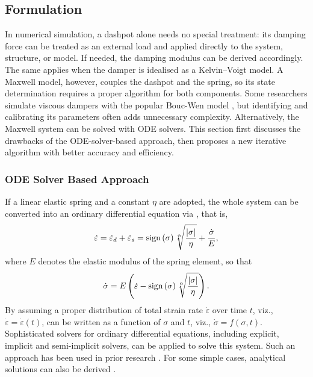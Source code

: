 \subsection{Formulation}
In numerical simulation, a dashpot alone needs no special treatment: its damping force can be treated as an external load and applied directly to the system, structure, or model.
If needed, the damping modulus can be derived accordingly.
The same applies when the damper is idealised as a Kelvin--Voigt model.
A Maxwell model, however, couples the dashpot and the spring, so its state determination requires a proper algorithm for both components.
Some researchers simulate viscous dampers with the popular Bouc-Wen \cite{Wen1976} model \cite{Gong2016,Chang2016}, but identifying and calibrating its parameters often adds unnecessary complexity.
Alternatively, the Maxwell system can be solved with ODE solvers.
This section first discusses the drawbacks of the ODE-solver-based approach, then proposes a new iterative algorithm with better accuracy and efficiency.
\subsubsection{ODE Solver Based Approach}\label{sec:ode_issue}
If a linear elastic spring and a constant $\eta$ are adopted, the whole system can be converted into an ordinary differential equation via , that is,
\begin{gather}
\dot\varepsilon=\dot\varepsilon_d+\dot\varepsilon_s=\text{sign}\left(\sigma\right)\sqrt[\alpha]{\dfrac{\left\vert\sigma\right\vert}{\eta}}+\dfrac{\dot\sigma}{E},
\end{gather}
where $E$ denotes the elastic modulus of the spring element, so that
\begin{gather}\label{eq:maxwell_ode}
\dot\sigma=E\left(\dot\varepsilon-\text{sign}\left(\sigma\right)\sqrt[\alpha]{\dfrac{\left\vert\sigma\right\vert}{\eta}}\right).
\end{gather}
By assuming a proper distribution of total strain rate $\dot\varepsilon$ over time $t$, viz., $\dot\varepsilon=\dot\varepsilon(t)$,  can be written as a function of $\sigma$ and $t$, viz., $\dot\sigma=f(\sigma,t)$.
Sophisticated solvers for ordinary differential equations, including explicit, implicit and semi-implicit solvers, can be applied to solve this system.
Such an approach has been used in prior research \cite{Kasai2004,Akcelyan2018}.
For some simple cases, analytical solutions can also be derived \cite{Hatada2000}.

